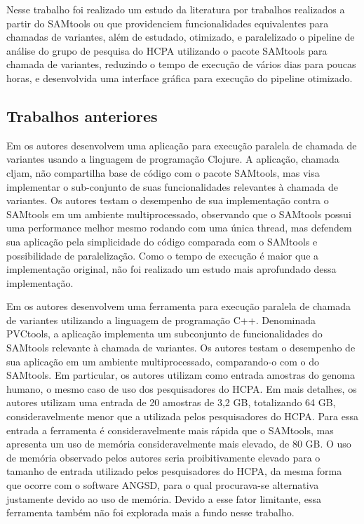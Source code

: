 \documentclass[cic,tc]{iiufrgs}
\begin{document}
Nesse trabalho foi realizado um estudo da literatura por trabalhos realizados a
partir do SAMtools ou que providenciem funcionalidades equivalentes para
chamadas de variantes, além de estudado, otimizado, e paralelizado o pipeline
de análise do grupo de pesquisa do HCPA utilizando o pacote SAMtools para
chamada de variantes, reduzindo o tempo de execução de vários dias para poucas
horas, e desenvolvida uma interface gráfica para execução do pipeline
otimizado.

\subsection{Trabalhos anteriores}
\label{sec:samant}

Em \cite{takeuchi2016cljam} os autores desenvolvem uma aplicação para execução
paralela de chamada de variantes usando a linguagem de programação Clojure. A
aplicação, chamada cljam, não compartilha base de código com o pacote SAMtools,
mas visa implementar o sub-conjunto de suas funcionalidades relevantes à
chamada de variantes. Os autores testam o desempenho de sua implementação
contra o SAMtools em um ambiente multiprocessado, observando que o SAMtools
possui uma performance melhor mesmo rodando com uma única thread, mas defendem
sua aplicação pela simplicidade do código comparada com o SAMtools e
possibilidade de paralelização. Como o tempo de execução é maior que a
implementação original, não foi realizado um estudo mais aprofundado dessa
implementação.

Em \cite{jin2019pvctools} os autores desenvolvem uma ferramenta para execução
paralela de chamada de variantes utilizando a linguagem de programação C++.
Denominada PVCtools, a aplicação implementa um subconjunto de funcionalidades
do SAMtools relevante à chamada de variantes. Os autores testam o desempenho de
sua aplicação em um ambiente multiprocessado, comparando-o com o do SAMtools.
Em particular, os autores utilizam como entrada amostras do genoma humano,
o mesmo caso de uso dos pesquisadores do HCPA. Em mais detalhes, os
autores utilizam uma entrada de 20 amostras de 3,2 GB, totalizando 64 GB,
consideravelmente menor que a utilizada pelos pesquisadores do HCPA. Para essa
entrada a ferramenta é consideravelmente mais rápida que o SAMtools, mas
apresenta um uso de memória consideravelmente mais elevado, de 80 GB. O uso de
memória observado pelos autores seria proibitivamente elevado para o tamanho de
entrada utilizado pelos pesquisadores do HCPA, da mesma forma que ocorre com o
software ANGSD, para o qual procurava-se alternativa justamente devido ao uso
de memória. Devido a esse fator limitante, essa ferramenta também não foi
explorada mais a fundo nesse trabalho.
\end{document}
